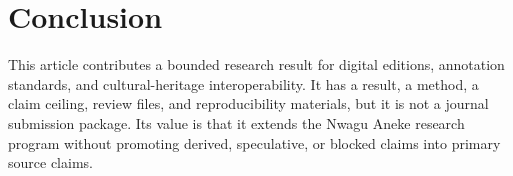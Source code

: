 \documentclass[sigconf,nonacm]{acmart}
\begin{document}
\section{Conclusion}
This article contributes a bounded research result for digital editions,
annotation standards, and cultural-heritage interoperability. It has a result, a
method, a claim ceiling, review files, and reproducibility materials, but it is
not a journal submission package. Its value is that it extends the Nwagu Aneke
research program without promoting derived, speculative, or blocked claims into
primary source claims.



\end{document}
